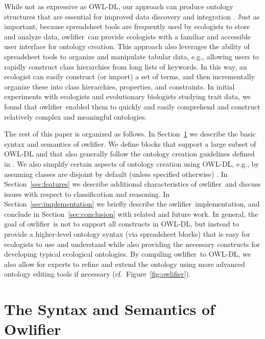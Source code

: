 \documentclass[5p,authoryear]{elsarticle}
\newcommand{\Owlifier}{\textsf{Owlifier}}
\newcommand{\owlifier}{\textsf{owlifier}}
\newcommand{\secref}[1]{Section~\ref{#1}}
\newcommand{\figref}[1]{Figure~\ref{#1}}
\begin{document}
While not as expressive as OWL-DL, our approach can produce ontology
structures that are essential for improved data discovery and
integration \cite{madin07:_ontol_for_descr_and_synth}. Just as
important, because spreadsheet tools are frequently used by ecologists
to store and analyze data, \owlifier\ can provide ecologists with a
familiar and accessible user interface for ontology creation. This
approach also leverages the ability of spreadsheet tools to organize
and manipulate tabular data, e.g., allowing users to rapidly construct
class hierarchies from long lists of keywords.  In this way, an
ecologist can easily construct (or import) a set of terms, and then
incrementally organize these into class hierarchies, properties, and
constraints. In initial experiments with ecologists and evolutionary
biologists studying trait data, we found that \owlifier\ enabled them
to quickly and easily comprehend and construct relatively complex and
meaningful ontologies.

The rest of this paper is organized as follows. In
\secref{sec:owlifier} we describe the basic syntax and semantics of
\owlifier. We define blocks that support a large subset of OWL-DL and
that also generally follow the ontology creation guidelines defined in
\cite{rector04:_owl_pizzas}. We also simplify certain aspects of
ontology creation using OWL-DL, e.g., by assuming classes are disjoint
by default (unless specified otherwise)
\cite{rector04:_owl_pizzas}. In \secref{sec:features} we describe
additional characteristics of \owlifier\ and discuss issues with
respect to classification and reasoning. In
\secref{sec:implementation} we briefly describe the \owlifier\
implementation, and conclude in \secref{sec:conclusion} with related
and future work. In general, the goal of \owlifier\ is not to support
all constructs in OWL-DL, but instead to provide a higher-level
ontology syntax (via spreadsheet blocks) that is easy for ecologists
to use and understand while also providing the necessary constructs
for developing typical ecological ontologies. By compiling \owlifier\
to OWL-DL, we also allow for experts to refine and extend the ontology
using more advanced ontology editing tools if necessary
(cf.~\figref{fig:owlifier}).



\section{The Syntax and Semantics of \Owlifier}
\label{sec:owlifier}
\end{document}
